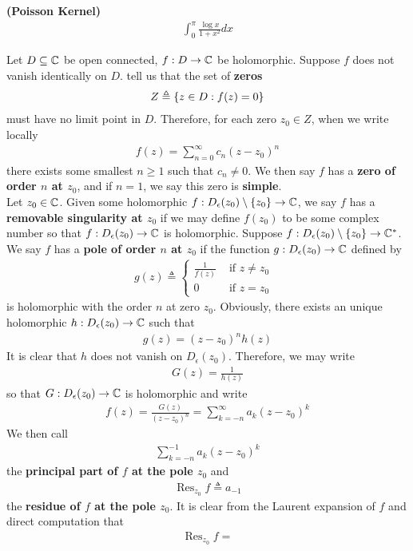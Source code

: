 \documentclass{report}
\begin{document}
\begin{Example}{\textbf{(Poisson Kernel)}}{}
\begin{align*}
  \int_0^{\pi } \frac{\log x}{1+x^2}dx
\end{align*}
\end{Example}
\begin{mdframed}
Let $D \subseteq \mathbb{C}$ be open connected, $f:D\rightarrow \mathbb{C}$ be holomorphic. Suppose $f$ does not vanish identically on  $D$.   tell us that the set of \textbf{zeros}
\begin{align*}
Z\triangleq \{ z\in D: f(z)=0 \}
\end{align*}
must have no limit point in $D$. Therefore, for each zero $z_0 \in Z$, when we write locally 
\begin{align*}
  f(z)= \sum_{n=0}^{\infty} c_n(z-z_0)^n
\end{align*}
there exists some smallest $n\geq 1$ such that $c_n \neq 0$. We then say $f$ has a  \textbf{zero of order $n$ at $z_0$}, and if  $n=1$, we say this zero is  \textbf{simple}. \\

Let $z_0\in\mathbb{C}$. Given some holomorphic $f:D_\epsilon (z_0)\setminus \{ z_0 \}\rightarrow \mathbb{C}$, we say $f$ has a \textbf{removable singularity at $z_0$} if we may define $f(z_0)$ to be some complex number so that $f:D_\epsilon (z_0)\rightarrow \mathbb{C}$ is holomorphic. Suppose $f:D_\epsilon (z_0)\setminus \{ z_0 \}\rightarrow \mathbb{C}^*$. We say $f$ has a  \textbf{pole of order $n$ at $z_0$} if the function $g:D_\epsilon (z_0)\rightarrow \mathbb{C}$ defined by 
\begin{align*}
g(z)\triangleq \begin{cases}
  \frac{1}{f(z)}& \text{ if $z\neq z_0$ }\\
  0& \text{ if $z=z_0$ }
\end{cases}
\end{align*}
is holomorphic with the order $n$ at zero  $z_0$. Obviously, there exists an unique holomorphic $h:D_\epsilon (z_0)\rightarrow \mathbb{C}$ such that 
\begin{align*}
g(z)= (z-z_0)^n h(z)
\end{align*}
It is clear that $h$ does not vanish on  $D_\epsilon (z_0)$. Therefore, we may write 
\begin{align*}
G(z)= \frac{1}{h(z)}
\end{align*}
so that $G:D_\epsilon (z_0)\rightarrow \mathbb{C}$ is holomorphic and write 
\begin{align*}
f(z)= \frac{G(z)}{(z-z_0)^n}=\sum_{k=-n}^{\infty}a_k (z-z_0)^k
\end{align*}
We then call 
\begin{align*}
\sum_{k=-n}^{-1}a_k(z-z_0)^k
\end{align*}
the \textbf{principal part of $f$ at the pole $z_0$} and 
\begin{align*}
\operatorname{Res}_{z_0}f\triangleq a_{-1}
\end{align*}
the \textbf{residue of $f$ at the pole  $z_0$}. It is clear from the Laurent expansion of $f$ and direct computation that   
\begin{align*}
\operatorname{Res}_{z_0}f=
\end{align*}
\end{mdframed}
\end{document}
